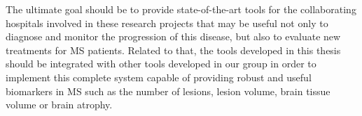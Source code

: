 The ultimate goal should be to provide state-of-the-art tools for the collaborating hospitals involved in these research projects  that may be useful not only to diagnose and  monitor the progression of this disease, but also to evaluate new treatments for MS patients.  Related to that, the tools developed in this thesis should be integrated with other tools developed in our group in order to implement this complete system capable of providing robust and useful biomarkers in MS such as the number of lesions, lesion volume, brain tissue volume or brain atrophy. 

